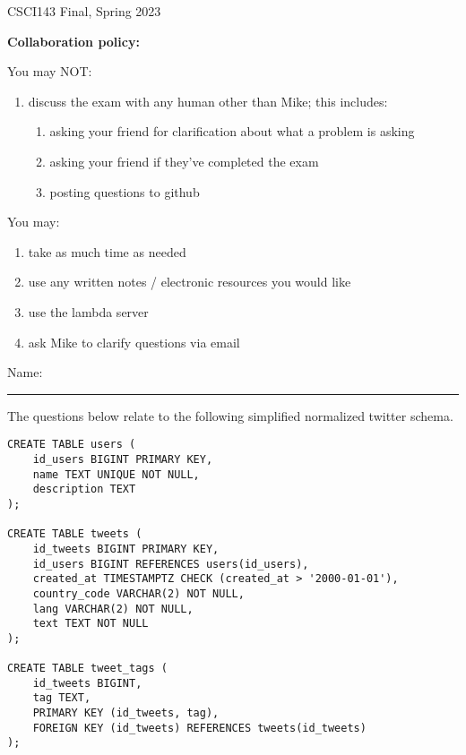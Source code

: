 \documentclass[12pt]{exam}
\theoremstyle{definition}
\begin{document}
\begin{center}
    {
\Large
    CSCI143 Final, Spring 2023
}

    \vspace{0.1in}
\end{center}

\noindent
\textbf{Collaboration policy:} 

\vspace{0.1in}
\noindent
You may NOT:
\begin{enumerate}
    \item discuss the exam with any human other than Mike; this includes:
        \begin{enumerate}
            \item asking your friend for clarification about what a problem is asking
            \item asking your friend if they've completed the exam
            \item posting questions to github
        \end{enumerate}
\end{enumerate}

\noindent
You may:
\begin{enumerate}
    \item take as much time as needed
    \item use any written notes / electronic resources you would like
    \item use the lambda server
    \item ask Mike to clarify questions via email
\end{enumerate}


\vspace{0.15in}

\vspace{0.25in}
\noindent
Name: 

\noindent
\rule{\textwidth}{0.1pt}
\vspace{0.15in}


\newpage
\noindent
The questions below relate to the following simplified normalized twitter schema.

\begin{lstlisting}
CREATE TABLE users (
    id_users BIGINT PRIMARY KEY,
    name TEXT UNIQUE NOT NULL,
    description TEXT
);

CREATE TABLE tweets (
    id_tweets BIGINT PRIMARY KEY,
    id_users BIGINT REFERENCES users(id_users),
    created_at TIMESTAMPTZ CHECK (created_at > '2000-01-01'),
    country_code VARCHAR(2) NOT NULL,
    lang VARCHAR(2) NOT NULL,
    text TEXT NOT NULL
);

CREATE TABLE tweet_tags (
    id_tweets BIGINT,
    tag TEXT,
    PRIMARY KEY (id_tweets, tag),
    FOREIGN KEY (id_tweets) REFERENCES tweets(id_tweets)
);
\end{lstlisting}
\end{document}

